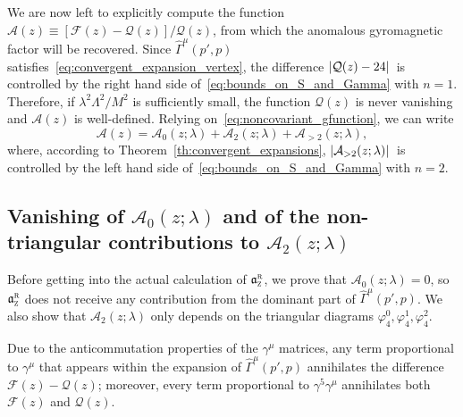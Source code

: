 \documentclass[a4paper, 11pt]{article}
\newcommand{\gyr}{\mathfrak{a}}								%
\newcommand{\rgyr}{\gyr_\textsc{z}^\textsc{r}}
\newcommand{\cutoff}{\Lambda}								%
\renewcommand{\phi}{\varphi}								%
\theoremstyle{thm}
\begin{document}
We are now left to explicitly compute the function $\mathcal{A}(z) \equiv [\mathcal{F}(z) - \mathcal{Q}(z)]/\mathcal{Q}(z)$, from which the anomalous gyromagnetic factor will be recovered. Since $\hat{\Gamma}^\mu(p', p)$ satisfies~\eqref{eq:convergent_expansion_vertex}, the difference $\abs*{\mathcal{Q}(z) - 24}$ is controlled by the right hand side of~\eqref{eq:bounds_on_S_and_Gamma} with $n = 1$. Therefore, if $\lambda^2 \cutoff^2/M^2$ is sufficiently small, the function $\mathcal{Q}(z)$ is never vanishing and $\mathcal{A}(z)$ is well-defined. Relying on~\eqref{eq:noncovariant_gfunction}, we can write
\begin{equation}
\mathcal{A}(z) = \mathcal{A}_0(z; \lambda) + \mathcal{A}_2(z; \lambda) + \mathcal{A}_{> 2}(z; \lambda),
\end{equation}
where, according to Theorem~\ref{th:convergent_expansions}, $\abs*{\mathcal{A}_{> 2}(z; \lambda)}$ is controlled by the left hand side of~\eqref{eq:bounds_on_S_and_Gamma} with $n = 2$. 

\subsection{Vanishing of \texorpdfstring{$\mathcal{A}_0(z; \lambda)$}{A0} and of the non-triangular contributions to \texorpdfstring{$\mathcal{A}_2(z; \lambda)$}{A2}}
\label{subsec:non_triangle_vanishing} 

Before getting into the actual calculation of $\rgyr$, we prove that $\mathcal{A}_0(z; \lambda) = 0$, so $\rgyr$ does not receive any contribution from the dominant part of $\hat{\Gamma}^\mu(p', p)$. We also show that $\mathcal{A}_2(z; \lambda)$ only depends on the triangular diagrams $\phi^0_4, \phi^1_4, \phi^2_4$.

Due to the anticommutation properties of the $\gamma^\mu$ matrices, any term proportional to $\gamma^\mu$ that appears within the expansion of $\hat{\Gamma}^\mu(p', p)$ annihilates the difference $\mathcal{F}(z) - \mathcal{Q}(z)$; moreover, every term proportional to $\gamma^5 \gamma^\mu$ annihilates both $\mathcal{F}(z)$ and $\mathcal{Q}(z)$.
\end{document}
